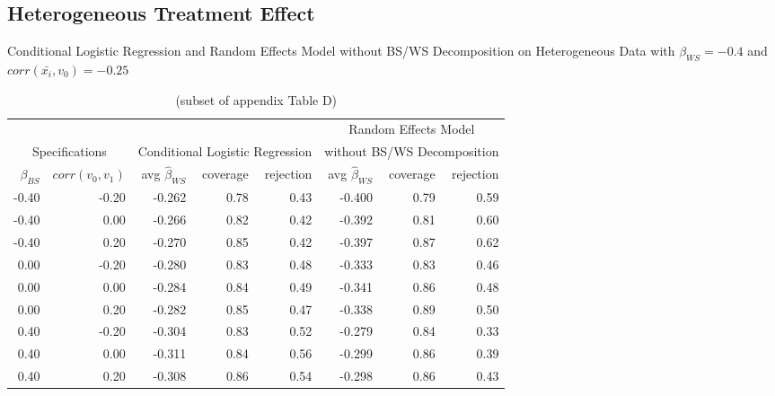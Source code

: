 \documentclass{article}
\begin{document}
        
    \subsection{Heterogeneous Treatment Effect}

    \begin{table}[ht]
        \centering
        \caption{Conditional Logistic Regression and Random Effects Model without BS/WS Decomposition on Heterogeneous Data with $\beta_{WS} = -0.4$ and $corr(\bar{x_i}, v_0) = -0.25$}
            \begin{tabular}{|r r || r r r | r r r| } %
                \hline
                \multicolumn{2}{|c||}{} & \multicolumn{3}{c|}{} & \multicolumn{3}{c|}{Random Effects Model}\\ 
                \multicolumn{2}{|c||}{Specifications} & \multicolumn{3}{c|}{Conditional Logistic Regression} & \multicolumn{3}{c|}{without BS/WS Decomposition} \\
                \hline
                $\beta_{BS}$ & $corr(v_0,v_1)$ & avg $\hat{\beta}_{WS}$ & coverage & rejection & avg $\hat{\beta}_{WS}$ & coverage & rejection \\
                \hline 
                -0.40	&-0.20	&-0.262	&0.78	&0.43	&-0.400	 &0.79	&0.59 \\
                -0.40	&0.00	&-0.266	&0.82	&0.42	&-0.392	 &0.81	&0.60 \\
                -0.40	&0.20	&-0.270	&0.85	&0.42	&-0.397	 &0.87	&0.62 \\ 
                0.00	&-0.20	&-0.280	&0.83	&0.48	&-0.333	 &0.83	&0.46 \\
                0.00	&0.00	&-0.284	&0.84	&0.49	&-0.341	 &0.86	&0.48 \\
                0.00	&0.20	&-0.282	&0.85	&0.47	&-0.338	 &0.89	&0.50 \\
                0.40	&-0.20	&-0.304	&0.83	&0.52	&-0.279	 &0.84	&0.33 \\
                0.40	&0.00	&-0.311	&0.84	&0.56	&-0.299	 &0.86	&0.39 \\
                0.40	&0.20	&-0.308	&0.86	&0.54	&-0.298	 &0.86	&0.43 \\
                \hline 
            \end{tabular}
        \caption*{(subset of appendix Table D)}
    \end{table}

\end{document}
